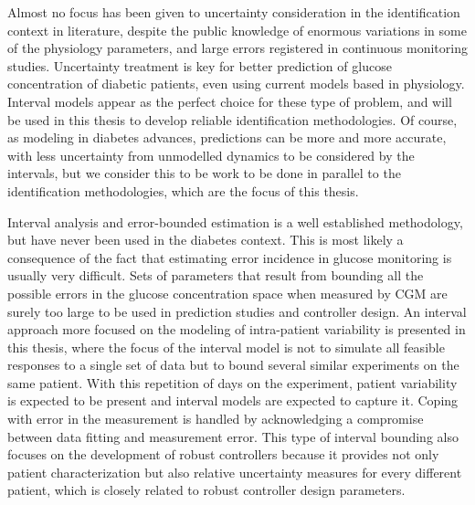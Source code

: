 Almost no focus has been given to uncertainty consideration in the identification context in literature, despite the public knowledge of enormous variations in some of the physiology parameters, and large errors registered in continuous monitoring studies. Uncertainty treatment is key for better prediction of glucose concentration of diabetic patients, even using current models based in physiology. Interval models appear as the perfect choice for these type of problem, and will be used in this thesis to develop reliable identification methodologies. Of course, as modeling in diabetes advances, predictions can be more and more accurate, with less uncertainty from unmodelled dynamics to be considered by the intervals, but we consider this to be work to be done in parallel to the identification methodologies, which are the focus of this thesis.

Interval analysis and error-bounded estimation is a well established methodology, but have never been used in the diabetes context. This is most likely a consequence of the fact that estimating error incidence in glucose monitoring is usually very difficult. Sets of parameters that result from bounding all the possible errors in the glucose concentration space when measured by CGM are surely too large to be used in prediction studies and controller design. An interval approach more focused on the modeling of intra-patient variability is presented in this thesis, where the focus of the interval model is not to simulate all feasible responses to a single set of data but to bound several similar experiments on the same patient. With this repetition of days on the experiment, patient variability is expected to be present and interval models are expected to capture it. Coping with error in the measurement is handled by acknowledging a compromise between data fitting and measurement error. This type of interval bounding also focuses on the development of robust controllers because it provides not only patient characterization but also relative uncertainty measures for every different patient, which is closely related to robust controller design parameters.

